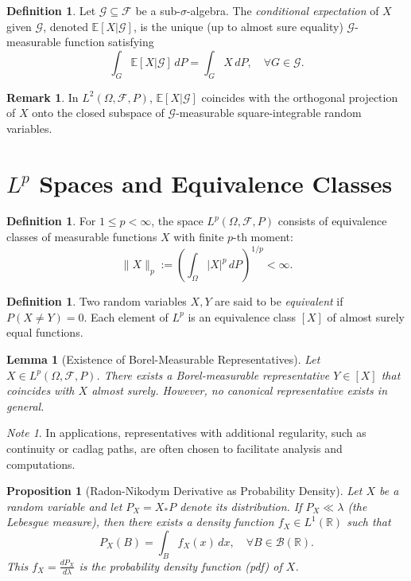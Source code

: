 \documentclass[11pt,reqno]{amsart}
\newtheorem{lemma}[theorem]{Lemma}
\newtheorem{proposition}[theorem]{Proposition}
\theoremstyle{definition}
\newtheorem{definition}[theorem]{Definition}
\newtheorem{remark}[theorem]{Remark}
\theoremstyle{remark}
\newtheorem*{note}{Note}
\begin{document}
\begin{definition}
	Let $\mathcal{G} \subseteq \mathcal{F}$ be a sub-$\sigma$-algebra. The \emph{conditional expectation} of $X$ given $\mathcal{G}$, denoted $\mathbb{E}[X|\mathcal{G}]$, is the unique (up to almost sure equality) $\mathcal{G}$-measurable function satisfying
	\[
		\int_G \mathbb{E}[X|\mathcal{G}] \, dP = \int_G X \, dP, \quad \forall G \in \mathcal{G}.
	\]
\end{definition}

\begin{remark}
	In $L^2(\Omega, \mathcal{F}, P)$, $\mathbb{E}[X|\mathcal{G}]$ coincides with the orthogonal projection of $X$ onto the closed subspace of $\mathcal{G}$-measurable square-integrable random variables.
\end{remark}

\section{\texorpdfstring{$L^p$}{Lp} Spaces and Equivalence Classes}

\begin{definition}
	For $1 \leq p < \infty$, the space $L^p(\Omega, \mathcal{F}, P)$ consists of equivalence classes of measurable functions $X$ with finite $p$-th moment:
	\[
		\|X\|_p := \left( \int_\Omega |X|^p \, dP \right)^{1/p} < \infty.
	\]
\end{definition}

\begin{definition}
	Two random variables $X, Y$ are said to be \emph{equivalent} if $P(X \neq Y)=0$. Each element of $L^p$ is an equivalence class $[X]$ of almost surely equal functions.
\end{definition}

\begin{lemma}[Existence of Borel-Measurable Representatives]
	Let $X \in L^p(\Omega, \mathcal{F}, P)$. There exists a Borel-measurable representative $Y \in [X]$ that coincides with $X$ almost surely. However, no canonical representative exists in general.
\end{lemma}

\begin{note}
	In applications, representatives with additional regularity, such as continuity or cadlag paths, are often chosen to facilitate analysis and computations.
\end{note}

\begin{proposition}[Radon-Nikodym Derivative as Probability Density]
	Let $X$ be a random variable and let $P_X = X_*P$ denote its distribution. If $P_X \ll \lambda$ (the Lebesgue measure), then there exists a density function $f_X \in L^1(\mathbb{R})$ such that
	\[
		P_X(B) = \int_B f_X(x) \, dx, \quad \forall B \in \mathcal{B}(\mathbb{R}).
	\]
	This $f_X = \frac{dP_X}{d\lambda}$ is the \emph{probability density function} (pdf) of $X$.
\end{proposition}
\end{document}
